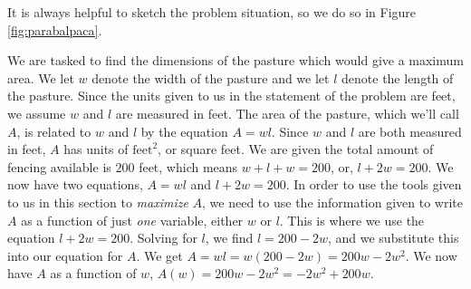 {
It is always helpful to sketch the problem situation, so we do so in Figure \ref{fig:parabalpaca}.



We are tasked to find the dimensions of the pasture which would give a maximum area.  We let $w$ denote the width of the pasture and we let $l$ denote the length of the pasture.  Since the units given to us in the statement of the problem are feet, we assume $w$ and $l$ are measured in feet.  The area of the pasture, which we'll call $A$, is related to $w$ and $l$ by the equation $A = wl$.  Since $w$ and $l$ are both measured in feet, $A$ has units of $\text{feet}^2$, or square feet.  We are given the total amount of fencing available is $200$ feet, which means $w + l + w = 200$, or, $l+2w = 200$.  We now have two equations, $A = wl$ and $l+2w = 200$.  In order to use the tools given to us in this section to \textit{maximize} $A$, we need to use the information given to write $A$ as a function of just \textit{one} variable, either $w$ or $l$. This is where we use the equation $l+2w = 200$.  Solving for $l$, we find $l = 200-2w$, and we substitute this into our equation for $A$.  We get $A = wl = w(200-2w) = 200w-2w^2$.  We now have $A$ as a function of $w$, $A(w) = 200w-2w^2 = -2w^2+200w$. 

\medskip

}
